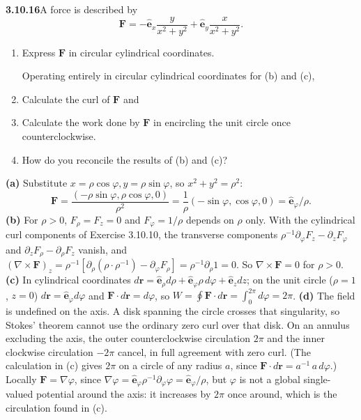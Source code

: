 \par\bigskip
\noindent\textbf{3.10.16}\quad A force is described by
\[
\mathbf{F}=-\hat{\mathbf{e}}_{x}\frac{y}{x^{2}+y^{2}}
+\hat{\mathbf{e}}_{y}\frac{x}{x^{2}+y^{2}}.
\]
\begin{enumerate}
\item[(a)] Express $\mathbf{F}$ in circular cylindrical coordinates.

  Operating entirely in circular cylindrical coordinates for (b) and (c),
\item[(b)] Calculate the curl of $\mathbf{F}$ and
\item[(c)] Calculate the work done by $\mathbf{F}$ in encircling the unit
  circle once counterclockwise.
\item[(d)] How do you reconcile the results of (b) and (c)?
\end{enumerate}
\solution
\textbf{(a)} Substitute $x=\rho\cos\varphi,y=\rho\sin\varphi$, so
$x^2+y^2=\rho^2$:
\[
\mathbf F=\frac{(-\rho\sin\varphi,\rho\cos\varphi,0)}{\rho^2}
=\frac1\rho(-\sin\varphi,\cos\varphi,0)
=\boxed{\hat{\mathbf e}_\varphi/\rho}.
\]
\textbf{(b)} For $\rho>0$, $F_\rho=F_z=0$ and $F_\varphi=1/\rho$ depends
on $\rho$ only. With the cylindrical curl components of
Exercise 3.10.10, the transverse components
$\rho^{-1}\partial_\varphi F_z-\partial_zF_\varphi$ and
$\partial_zF_\rho-\partial_\rho F_z$ vanish,
and $(\nabla\times\mathbf F)_z=\rho^{-1}[\partial_\rho(\rho\cdot\rho^{-1})
-\partial_\varphi F_\rho]=\rho^{-1}\partial_\rho1=0$.
So $\boxed{\nabla\times\mathbf F=0}$ for $\rho>0$.
\textbf{(c)} In cylindrical coordinates
$d\mathbf r=\hat{\mathbf e}_\rho d\rho+\hat{\mathbf e}_\varphi\rho\,d\varphi
+\hat{\mathbf e}_z dz$; on the unit circle ($\rho=1$, $z=0$)
$d\mathbf r=\hat{\mathbf e}_\varphi d\varphi$ and
$\mathbf F\cdot d\mathbf r=d\varphi$, so
$\boxed{W=\oint\mathbf F\cdot d\mathbf r=\int_0^{2\pi}d\varphi=2\pi}$.
\textbf{(d)} The field is undefined on the axis. A disk spanning
the circle crosses that singularity, so Stokes' theorem cannot
use the ordinary zero curl over that disk. On an annulus excluding
the axis, the outer counterclockwise circulation $2\pi$ and the
inner clockwise circulation $-2\pi$ cancel, in full agreement with
zero curl. (The calculation in (c) gives $2\pi$ on a circle of any
radius $a$, since $\mathbf F\cdot d\mathbf r=a^{-1}\,a\,d\varphi$.)
Locally $\mathbf F=\nabla\varphi$, since
$\nabla\varphi=\hat{\mathbf e}_\varphi\rho^{-1}\partial_\varphi\varphi
=\hat{\mathbf e}_\varphi/\rho$, but $\varphi$ is not
a global single-valued potential around the axis: it increases by
$2\pi$ once around, which is the circulation found in (c).

